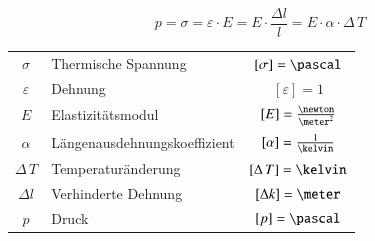 \vspace{-0.2cm}

$$\boxed{ p = \sigma = \varepsilon \cdot E = E \cdot \frac{\Delta l}{l} =  E \cdot \alpha \cdot \Delta \, T } $$

\renewcommand{\arraystretch}{1.3}
\begin{tabular}{c l c}
	$\sigma$ 		& Thermische Spannung 			& $[\sigma] = \pascal$ 				\\
	$\varepsilon$ 	& Dehnung 						& $[\varepsilon] = 1$ 				\\
	$E$ 			& Elastizitätsmodul 			& $[E] = \frac{\newton}{\meter^2}$ 	\\
	$\alpha$ 		& Längenausdehnungskoeffizient 	& $[\alpha] = \frac{1}{\kelvin}$ 	\\ 
	$\Delta \, T $ 	& Temperaturänderung 			& $[\Delta \, T ] = \kelvin$ 		\\
	$\Delta l$		& Verhinderte Dehnung			& $[\Delta k] = \meter$				\\
	$p$ 			& Druck 						& $[p] = \pascal$
\end{tabular}\medbreak


\renewcommand{\arraystretch}{1}